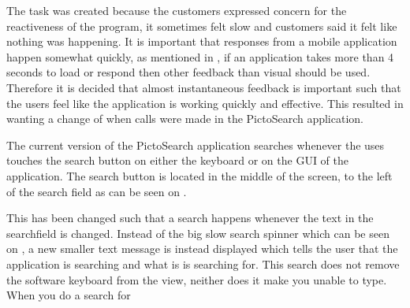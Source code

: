 The task was created because the customers expressed concern for the reactiveness of the program, it sometimes felt slow and customers said it felt like nothing was happening.
It is important that responses from a mobile application happen somewhat quickly, as mentioned in \cite{Roto:2005:NNF:1062745.1062747}, if an application takes more than 4 seconds to load or respond then other feedback than visual should be used.
Therefore it is decided that almost instantaneous feedback is important such that the users feel like the application is working quickly and effective.
This resulted in wanting a change of when calls were made in the PictoSearch application.

The current version of the PictoSearch application searches whenever the uses touches the search button on either the keyboard or on the GUI of the application.
The search button is located in the middle of the screen, to the left of the search field as can be seen on .

This has been changed such that a search happens whenever the text in the searchfield is changed.
Instead of the big slow search spinner which can be seen on , a new smaller text message is instead displayed which tells the user that the application is searching and what is is searching for. 
This search does not remove the software keyboard from the view, neither does it make you unable to type.
When you do a search for 